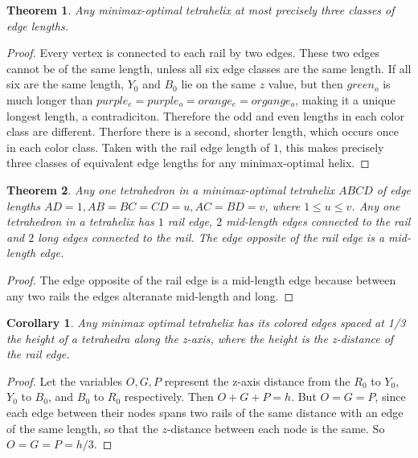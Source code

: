 \documentclass[11pt]{article}
\newtheorem{theorem}{Theorem}
\newtheorem{corollary}{Corollary}
\begin{document}
\begin{theorem}
  Any minimax-optimal tetrahelix at most precisely three classes of edge lengths.
\end{theorem}

\begin{proof}
  Every vertex is connected to each rail by two edges. These two edges cannot be of the same length, unless all six edge classes are the same
  length. If all six are the same length, $Y_0$ and $B_0$ lie on the same $z$ value, but then $green_o$ is much longer than $purple_e = purple_o = orange_e = organge_o$,
  making it a unique longest length, a contradiciton. Therefore the odd and even lengths in each color class are different. Therfore there is a second,
  shorter length, which occurs once in each color class. Taken with the rail edge length of $1$, this makes precisely three classes of equivalent
  edge lengths for any minimax-optimal helix.
\end{proof}
  
\begin{theorem}
  \label{tetrahelixoptimality}
  Any one tetrahedron in a minimax-optimal tetrahelix $ABCD$ of edge lengths $AD = 1, AB = BC = CD = u , AC = BD = v$, where $1 \leq u \leq v$.
  Any one tetrahedron in a tetrahelix has $1$ rail edge, $2$ mid-length edges connected to the rail and $2$ long edges connected to the rail.
  The edge opposite of the rail edge is a mid-length edge.
\end{theorem}

\begin{proof}
The edge opposite of the rail edge is a mid-length edge because between any two rails the edges alteranate mid-length and long.
\end{proof}

\begin{corollary}
  \label{eventhirds}
  Any minimax optimal tetrahelix has its colored edges spaced at 1/3 the height of
  a tetrahedra along the z-axis, where the height is the z-distance of the rail edge.
  \end{corollary}

\begin{proof}
  Let the variables $O,G,P$ represent the z-axis distance from the
  $R_0$ to $Y_0$, $Y_0$ to $B_0$, and
  $B_0$ to $R_0$ respectively. Then $O+G+P = h$. But $O=G=P$, since each edge between
  their nodes spans two rails of the same distance with an edge of the same length,
  so that the $z$-distance between each node is the same. So $O=G=P=h/3$.
\end{proof}
\end{document}
